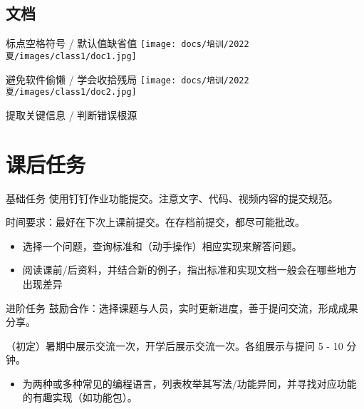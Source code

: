 \subsection{文档}

\begin{frame}{标点空格符号 / 默认值缺省值}
    \centering
    \texttt{[image: docs/培训/2022夏/images/class1/doc1.jpg]}
\end{frame}

\begin{frame}{避免软件偷懒 / 学会收拾残局}
    \centering
    \texttt{[image: docs/培训/2022夏/images/class1/doc2.jpg]}
\end{frame}

\begin{frame}{提取关键信息 / 判断错误根源}
    
\end{frame}


\section{课后任务}

\begin{frame}{基础任务}
    使用钉钉作业功能提交。注意文字、代码、视频内容的提交规范。
    
    时间要求：最好在下次上课前提交。在存档前提交，都尽可能批改。
    
    \begin{itemize}
        \item 选择一个问题，查询标准和（动手操作）相应实现来解答问题。
        \item 阅读课前/后资料，并结合新的例子，指出标准和实现文档一般会在哪些地方出现差异
    \end{itemize}
    
\end{frame}

\begin{frame}{进阶任务}
    鼓励合作：选择课题与人员，实时更新进度，善于提问交流，形成成果分享。
    
    （初定）暑期中展示交流一次，开学后展示交流一次。各组展示与提问 5 - 10 分钟。
    
    \begin{itemize}
        \item 为两种或多种常见的编程语言，列表枚举其写法/功能异同，并寻找对应功能的有趣实现（如功能包）。
    \end{itemize}
\end{frame}